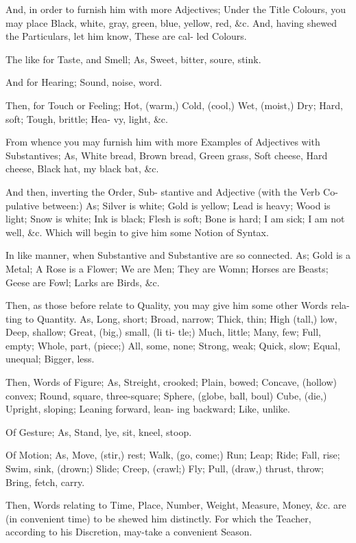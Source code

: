 And, in order to furnish him with more
Adjectives; Under the Title Colours, you
may place Black, white, gray, green, blue,
yellow, red, &c. And, having shewed the
Particulars, let him know, These are cal-
led Colours.

The like for Taste, and Smell; As,
Sweet, bitter, soure, stink.

And for Hearing; Sound, noise, word.

Then, for Touch or Feeling; Hot,
(warm,) Cold, (cool,) Wet, (moist,)
Dry; Hard, soft; Tough, brittle; Hea-
vy, light, &c.

From whence you may furnish him
with more Examples of Adjectives with
Substantives; As, White bread, Brown
bread, Green grass, Soft cheese, Hard
cheese, Black hat, my black bat, &c.

And then, inverting the Order, Sub-
stantive and Adjective (with the Verb Co-
pulative between:) As; Silver is white;
Gold is yellow; Lead is heavy; Wood is
light; Snow is white; Ink is black; Flesh
is soft; Bone is hard; I am sick; I am
not well, &c. Which will begin to give
him some Notion of Syntax.

In like manner, when Substantive and
Substantive are so connected. As; Gold is
a Metal; A Rose is a Flower; We are
Men; They are Womn; Horses are
Beasts; Geese are Fowl; Larks are
Birds, &c.

Then, as those before relate to Quality,
you may give him some other Words rela-
ting to Quantity. As, Long, short; Broad,
narrow; Thick, thin; High (tall,) low,
Deep, shallow; Great, (big,) small, (li ti-
tle;) Much, little; Many, few; Full,
empty; Whole, part, (piece;) All, some,
none; Strong, weak; Quick, slow; Equal,
unequal; Bigger, less.

Then, Words of Figure; As, Streight,
crooked; Plain, bowed; Concave, (hollow)
convex; Round, square, three-square;
Sphere, (globe, ball, boul) Cube, (die,)
Upright, sloping; Leaning forward, lean-
ing backward; Like, unlike.

Of Gesture; As, Stand, lye, sit, kneel,
stoop.

Of Motion; As, Move, (stir,) rest;
Walk, (go, come;) Run; Leap; Ride;
Fall, rise; Swim, sink, (drown;) Slide;
Creep, (crawl;) Fly; Pull, (draw,) thrust,
throw; Bring, fetch, carry.

Then, Words relating to Time, Place,
Number, Weight, Measure, Money, &c.
are (in convenient time) to be shewed
him distinctly. For which the Teacher,
according to his Discretion, may-take a
convenient Season.


